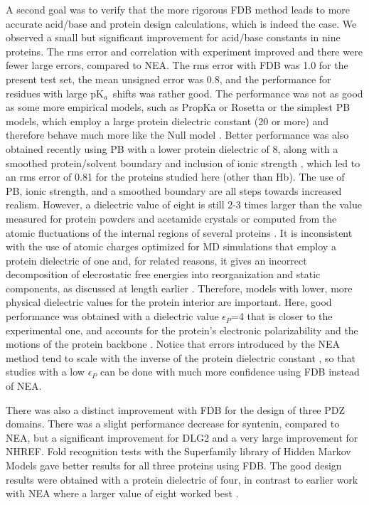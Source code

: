 \documentclass[a4paper,12pt]{article}
\newcommand{\pk}{pK$_a$}
\begin{document}
A second goal was to verify that the more rigorous FDB method leads to more accurate acid/base and protein design calculations,
which is indeed the case. We observed a small but significant improvement for acid/base constants in nine proteins. The rms
error and correlation with experiment improved and there were fewer large errors, compared to NEA. The rms error with FDB was
1.0 for the present test set, the mean unsigned error was 0.8, and the performance for residues with large \pk\ shifts was rather
good. The performance was not as good as some more empirical models, such as PropKa or Rosetta \cite{Kilambi12} or the simplest
PB models, which employ a large protein dielectric constant (20 or more) and therefore behave much more like the Null model
\cite{Warwicker99,Zheng13}. Better performance was also obtained recently using PB with a lower protein dielectric of 8, along
with a smoothed protein/solvent boundary and inclusion of ionic strength \cite{Wang15}, which led to an rms error of 0.81 for
the proteins studied here (other than Hb). The use of PB, ionic strength, and a smoothed boundary are all steps towards increased
realism. However, a dielectric value of eight is still 2-3 times larger than the value measured for protein powders and acetamide
crystals or computed from the atomic fluctuations of the internal regions of several proteins \cite{Simonson96c,Simonson03}.
It is inconsistent with the use of atomic charges optimized for MD simulations that employ a protein dielectric of one
\cite{Simonson99,Archontis05} and, for related reasons, it gives an incorrect decomposition of elecrostatic free energies into
reorganization and static components, as discussed at length earlier \cite{Simonson99,Archontis05}. Therefore, models with lower,
more physical dielectric values for the protein interior are important. Here, good performance was obtained with a dielectric
value $\epsilon_P$=4 that is closer to the experimental one, and accounts for the protein's electronic polarizability and the
motions of the protein backbone \cite{Simonson13c}. Notice that errors introduced by the NEA method tend to scale with the
inverse of the protein dielectric constant \cite{Polydorides13,Gaillard14}, so that studies with a low $\epsilon_P$ can be done
with much more confidence using FDB instead of NEA.

There was also a distinct improvement with FDB for the design of three PDZ domains. There was a slight performance
decrease for syntenin, compared to NEA, but a significant improvement for DLG2 and a very large improvement for NHREF.
Fold recognition tests with the Superfamily library of Hidden Markov Models gave better results for all three proteins
using FDB. The good design results were obtained with a protein dielectric of four, in contrast to earlier work with
NEA where a larger value of eight worked best \cite{Mignon17}.
\end{document}
